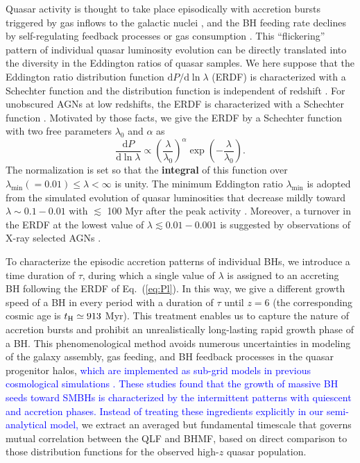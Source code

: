 \documentclass[twocolumn, twocolappendix]{aastex63}
\newcommand{\tlife}{\tau}
\newcommand{\D}{\mathrm{d}}
\newcommand{\blue}[1]{\textcolor{blue}{ #1}}
\begin{document}
\begin{CJK*}{UTF8}{gbsn}
Quasar activity is thought to take place episodically with accretion bursts triggered by gas inflows to the galactic nuclei
\citep{2005Natur.433..604D,2005ApJ...630..705H}, 
and the BH feeding rate declines by self-regulating feedback processes \citep[e.g.,][]{2008ApJ...686..815Y,2011ApJ...737...26N} 
or gas consumption \citep{1991MNRAS.248..754P,2005ApJ...634..901Y,2007MNRAS.377L..25K}. 
This ``flickering'' pattern of individual quasar luminosity evolution can be directly translated into the diversity 
in the Eddington ratios of quasar samples. 
We here suppose that the Eddington ratio distribution function $\D P/ \D\ln\lambda$ (ERDF) is characterized
with a Schechter function and the distribution function is independent of redshift 
\citep{2006ApJ...639..700H,2009ApJ...698.1550H}.
For unobscured AGNs at low redshifts, the ERDF is characterized with a Schechter function
\citep{2015MNRAS.447.2085S,2016ApJ...826...12J,2018MNRAS.474.1225A}.
Motivated by those facts, we give the ERDF by a Schechter function with two free parameters $\lambda_0$ and $\alpha$ as
%
\begin{equation}
  \label{eq:Pl}
  \frac{\D P}{ \D \ln \lambda} \propto
  \left(\frac{\lambda} {\lambda_0} \right)^\alpha \exp{\left(-\frac{\lambda}{\lambda_0}\right)}.
\end{equation}
%
The normalization is set so that the \textbf{integral} of this function over $\lambda_\mathrm{min}(=0.01) \leq \lambda < \infty$ is unity.
The minimum Eddington ratio $\lambda_\mathrm{min}$ is adopted from the simulated evolution of quasar luminosities 
that decrease mildly toward $\lambda \sim 0.1-0.01$ with $\lesssim$ 100 Myr after the peak activity \citep{2011ApJ...737...26N}.
Moreover, a turnover in the ERDF at the lowest value of $\lambda\lesssim 0.01-0.001$ is suggested by observations of X-ray selected AGNs \citep{2018MNRAS.474.1225A}.  


To characterize the episodic accretion patterns of individual BHs, 
we introduce a time duration of $\tlife$, during which a single value of $\lambda$ is assigned to an accreting BH
following the ERDF of Eq.~(\ref{eq:Pl}).
In this way, we give a different growth speed of a BH in every period with a duration of $\tlife$ until $z=6$ 
(the corresponding cosmic age is $t_{\rm H}\simeq 913$ Myr).
This treatment enables us to capture the nature of accretion bursts and prohibit an unrealistically 
long-lasting rapid growth phase of a BH.
This phenomenological method avoids numerous uncertainties in modeling of the galaxy assembly, 
gas feeding, and BH feedback processes in the quasar progenitor halos,
\blue{
which are implemented as sub-grid models in previous cosmological simulations \citep{2017MNRAS.467.4243D,2018MNRAS.473.4003B,2019MNRAS.488.4004L}.
These studies found that the growth of massive BH seeds toward SMBHs is characterized by the intermittent patterns with quiescent and accretion phases.
Instead of treating these ingredients explicitly in our semi-analytical model,} we extract 
an averaged but fundamental timescale that governs mutual correlation between the QLF and BHMF,
based on direct comparison to those distribution functions for the observed high-$z$ quasar population.



\end{CJK*}
\end{document}
